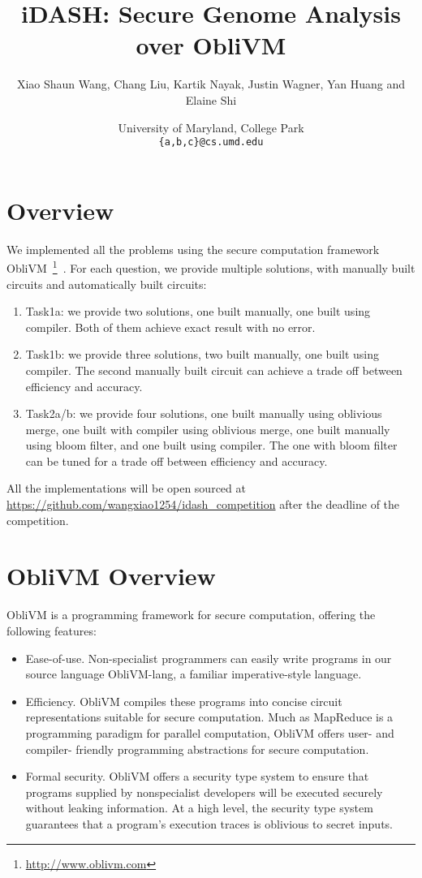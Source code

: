 \documentclass[11pt]{article}
\title{iDASH: Secure Genome Analysis over {\sf ObliVM}}
\author{Xiao Shaun Wang, Chang Liu, Kartik Nayak, Justin Wagner, Yan Huang and Elaine Shi}
\date{University of Maryland, College Park\\
{\tt \{a,b,c\}@cs.umd.edu}}
\begin{document}
\maketitle
\section{Overview}
We implemented all the problems using the secure computation framework {\sf ObliVM}~\footnote{\url{http://www.oblivm.com}}~\cite{oblivm}.
For each question, we provide multiple solutions, with manually built circuits and automatically built circuits:
\begin{enumerate}
\item Task1a: we provide two solutions, one built manually, one built using compiler. Both of them achieve exact result with no error.
\item Task1b: we provide three solutions, two built manually, one built using compiler. The second manually built circuit can achieve a trade off between efficiency and accuracy.
\item Task2a/b: we provide four solutions, one built manually using oblivious merge, one built with compiler using oblivious merge, one built manually using bloom filter, and one built using compiler. The one with bloom filter can be tuned for a trade off between efficiency and accuracy.
\end{enumerate}

All the implementations will be open sourced at \url{https://github.com/wangxiao1254/idash_competition} after the deadline of the competition.





\appendix

\section{{\sf ObliVM} Overview}

{\sf ObliVM} is a programming framework for secure computation, offering the 
following features:
\begin{itemize}
\item
{\sf Ease-of-use.} Non-specialist programmers can easily 
write programs in our source language {\sf ObliVM-lang}, a 
familiar imperative-style language.
\item
{\sf Efficiency.} {\sf ObliVM} compiles these programs into 
concise circuit representations suitable for secure computation. 
Much as MapReduce is a programming paradigm for 
parallel computation, {\sf ObliVM} offers user- and compiler- friendly
programming abstractions for secure computation.
\item
{\sf Formal security.}
{\sf ObliVM} offers a security type system to ensure 
that programs supplied by nonspecialist developers
will be executed securely without leaking information.
At a high level, the security type system guarantees
that a program's execution traces 
is oblivious to secret inputs.
\end{itemize}
\end{document}
